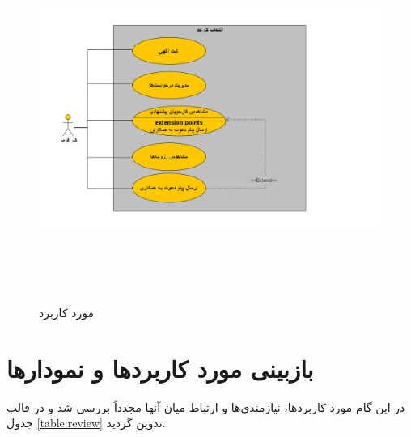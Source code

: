 \documentclass[12pt,svgnames,oneside]{book}
\begin{document}
\begin{figure}[H]
	\caption{مورد کاربرد }
	\begin{center}
		\includegraphics[width=\textwidth, height=12cm]{./images/5}
	\end{center}
\end{figure}

\section{بازبینی مورد کاربرد‌ها و نمودارها}		
در این گام مورد کاربرد‌ها، نیازمندی‌ها و ارتباط میان‌ آنها مجدداً بررسی شد و در قالب جدول \ref{table:review} تدوین گردید.
\end{document}
